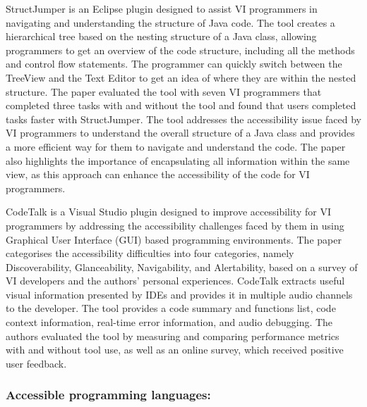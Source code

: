 \documentclass{l4proj}
\begin{document}
StructJumper \cite{structujumper_2015} is an Eclipse plugin designed to assist VI programmers in navigating and understanding the structure of Java code. The tool creates a hierarchical tree based on the nesting structure of a Java class, allowing programmers to get an overview of the code structure, including all the methods and control flow statements. The programmer can quickly switch between the TreeView and the Text Editor to get an idea of where they are within the nested structure. The paper evaluated the tool with seven VI programmers that completed three tasks with and without the tool and found that users completed tasks faster with StructJumper. The tool addresses the accessibility issue faced by VI programmers to understand the overall structure of a Java class and provides a more efficient way for them to navigate and understand the code. The paper also highlights the importance of encapsulating all information within the same view, as this approach can enhance the accessibility of the code for VI programmers.

CodeTalk \cite{codetalk_18} is a Visual Studio plugin designed to improve accessibility for VI programmers by addressing the accessibility challenges faced by them in using Graphical User Interface (GUI) based programming environments. The paper categorises the accessibility difficulties into four categories, namely Discoverability, Glanceability, Navigability, and Alertability, based on a survey of VI developers and the authors' personal experiences. CodeTalk extracts useful visual information presented by IDEs and provides it in multiple audio channels to the developer. The tool provides a code summary and functions list, code context information, real-time error information, and audio debugging. The authors evaluated the tool by measuring and comparing performance metrics with and without tool use, as well as an online survey, which received positive user feedback.

\subsubsection{Accessible programming languages:} 
\end{document}
